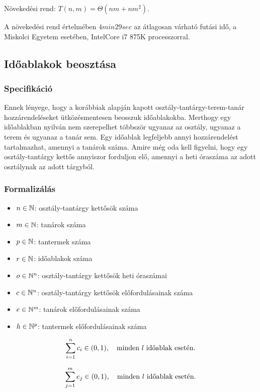 \documentclass[a4paper,12pt]{article}
\begin{document}
Növekedési rend: $T(n,m)=\Theta (nm+nm^2).$

A növekedési rend értelmében $4min 29sec$ az átlagosan várható futási idő, a Miskolci Egyetem esetében, IntelCore i7 875K processzorral. 

\subsection{Időablakok beosztása}

\subsubsection{Specifikáció}

Ennek lényege, hogy a korábbiak alapján kapott osztály-tantárgy-terem-tanár
hozzárendeléseket ütközésmentesen beosszuk időablakokba. Merthogy egy időablakban nyilván nem szerepelhet többször ugyanaz az osztály, ugyanaz a terem és ugyanaz a tanár sem. Egy időablak legfeljebb annyi hozzárendelést tartalmazhat, amennyi a tanárok száma. Amire még oda kell figyelni, hogy egy osztály-tantárgy kettős annyiszor forduljon elő, amennyi a heti óraszáma az adott osztálynak az adott tárgyból.

\subsubsection{Formalizálás}

\begin{itemize}
    \item $n \in \Bbb{N}$: osztály-tantárgy kettősök száma
    \item $m \in \Bbb{N}$: tanárok száma
    \item $p \in \Bbb{N}$: tantermek száma
    \item $r \in \Bbb{N}$: időablakok száma
    \item $o \in \Bbb{N}^n$: osztály-tantárgy kettősök heti óraszámai
    \item $c \in \Bbb{N}^n$: osztály-tantárgy kettősök előfordulásainak száma
    \item $e \in \Bbb{N}^m$: tanárok előfordulásainak száma
    \item $h \in \Bbb{N}^p$: tantermek előfordulásainak száma
\end{itemize}

$$\sum_{i=1}^n c_i \in (0,1), \quad \hbox{minden }l\hbox{ időablak esetén.}$$

$$\sum_{j=1}^m e_j \in (0,1), \quad \hbox{minden }l\hbox{ időablak esetén.}$$
\end{document}
